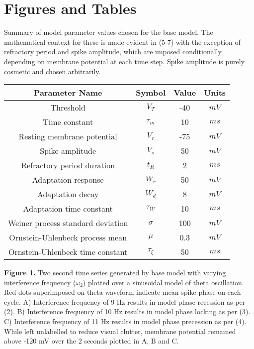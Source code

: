 \documentclass[12pt, letterpaper]{article}
\newenvironment{collapsable}{}{}
\begin{document}
\newpage
\begin{collapsable}

  \section*{\normalfont\normalsize\bf Figures and Tables}\vspace{12pt}

   Summary of model parameter values chosen for the base model. The
  mathematical context for these is made evident in (5-7) with the exception of
  refractory period and spike amplitude, which are imposed conditionally
  depending on membrane potential at each time step. Spike amplitude is purely
  cosmetic and chosen arbitrarily.
  \begin{table}[h!]
    \begin{center}
      \begin{tabular}{c|c|c|c}
        Parameter Name & Symbol & Value & Units\\
        \hline
        Threshold & $V_T$ & -40 & $mV$\\
        Time constant & $\tau_m$ & 10 & $ms$\\
        Resting membrane potential & $V_r$ & -75 & $mV$\\
        Spike amplitude & $V_s$ & 50 & $mV$\\
        Refractory period duration & $t_R$ & 2 & $ms$\\
        Adaptation response & $W_r$ & 50 & $mV$\\
        Adaptation decay & $W_d$ & 8 & $mV$\\
        Adaptation time constant & $\tau_W$ & 10 & $ms$\\
        Weiner process standard deviation & $\sigma$ & 100 & $mV$\\
        Ornstein-Uhlenbeck process mean & $\mu$ & 0.3 & $mV$\\
        Ornstein-Uhlenbeck time constant & $\tau_{\xi}$ & 50 & $ms$
      \end{tabular}
    \end{center}
  \end{table}
  \begin{center}
  \end{center}
  {\bf Figure 1.} Two second time series generated by base model with varying
  interference frequency ($\omega_2$) plotted over a sinusoidal model of theta
  oscillation. Red dots superimposed on theta waveform indicate mean spike phase
  on each cycle. A) Interference frequency of 9 Hz results in model phase
  recession as per (2). B) Interference frequency of 10 Hz results in model phase
  locking as per (3). C) Interference frequency of 11 Hz results in model phase
  precession as per (4). While left unlabelled to reduce visual clutter, membrane
  potential remained above -120 mV over the 2 seconds plotted in A, B and C.


\end{collapsable}
\end{document}
